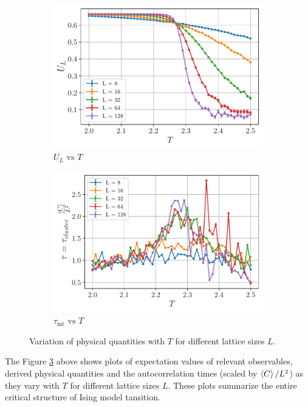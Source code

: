 \documentclass[../thesis_main.tex]{subfiles}
\begin{document}
\begin{figure}[!htb]\ContinuedFloat
    \centering
    \begin{subfigure}[b]{0.49\textwidth}
        \centering
        \includegraphics[width=\textwidth]{images/monte_carlo/wolff_cluster/U_L.pdf}
        \caption{$U_L \text{ vs } T$}
        \label{bindercumulant}
    \end{subfigure}
    \begin{subfigure}[b]{0.49\textwidth}
        \centering
        \includegraphics[width=\textwidth]{images/monte_carlo/wolff_cluster/autocorr times.pdf}
        \caption{$\tau_\text{int} \text{ vs } T$}
        \label{autocorrelationtime}
    \end{subfigure}
    \caption{Variation of physical quantities with $T$ for different lattice sizes $L$.}
    \label{expvalvsT}
\end{figure}
\FloatBarrier \!\!\!\!\!\!\!\!\!\!\!\!
The Figure \ref{expvalvsT} above shows plots of expectation values of relevant observables, derived physical quantities and the autocorrelation times (scaled by $\expval{C}/L^2$) as they vary with $T$ for different lattice sizes $L$. These plots summarize the entire critical structure of Ising model tansition.
\end{document}

